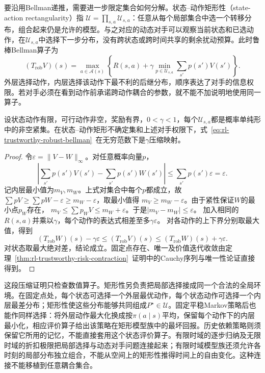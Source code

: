 要沿用Bellman递推，需要进一步限定集合如何分解。状态--动作矩形性（state-action rectangularity）指
$\mathcal U=\prod_{s,a}\mathcal U_{s,a}$：任意从每个局部集合中选一个转移分布，组合起来仍是允许的模型。与之对应的动态对手可以观察当前状态和已选动作，在$\mathcal U_{s,a}$中选择下一步分布，没有跨状态或跨时间共享的剩余扰动预算。此时鲁棒Bellman算子为
\begin{equation}
  (T_{\mathrm{rob}}V)(s)
    =\max_{a\in\mathcal A(s)}
      \left\{R(s,a)+\gamma
        \min_{p\in\mathcal U_{s,a}}\sum_{s'}p(s')V(s')\right\}.
  \label{eq:rl-trustworthy-robust-bellman}
\end{equation}
外层选择动作，内层选择该动作下最不利的后继分布，顺序表达了对手的信息权限。若对手必须在看到动作前承诺跨动作耦合的参数，就不能不加说明地使用同一算子。

\begin{theorem}[矩形鲁棒Bellman算子的压缩性]
  \label{thm:rl-trustworthy-robust-contraction}
  设状态动作有限，可行动作非空，奖励有界，$0<\gamma<1$，每个$\mathcal U_{s,a}$都是概率单纯形中的非空紧集。在状态--动作矩形不确定集和上述对手权限下，式~\eqref{eq:rl-trustworthy-robust-bellman}~在无穷范数下是$\gamma$压缩映射。
\end{theorem}
\begin{proof}
  令$\varepsilon=\lVert V-W\rVert_\infty$。对任意概率向量$p$，
  \[
    \left|\sum_{s'}p(s')V(s')-\sum_{s'}p(s')W(s')\right|
      \leq\sum_{s'}p(s')\varepsilon=\varepsilon.
  \]
  记内层最小值为$m_V,m_W$。上式对集合中每个$p$都成立，故
  $\sum pV\geq\sum pW-\varepsilon\geq m_W-\varepsilon$，取最小值得
  $m_V\geq m_W-\varepsilon$。由于紧性保证$W$的最小点$p_W$存在，
  $m_V\leq\sum p_WV\leq m_W+\varepsilon$。于是$|m_V-m_W|\leq\varepsilon$。
  加入相同的$R(s,a)$并乘以$\gamma$，每个动作的表达式相差至多$\gamma\varepsilon$。
  对各动作的上下界分别取最大值，得到
  \[
    (T_{\mathrm{rob}}W)(s)-\gamma\varepsilon
      \leq(T_{\mathrm{rob}}V)(s)
      \leq(T_{\mathrm{rob}}W)(s)+\gamma\varepsilon.
  \]
  对状态取最大绝对差，结论成立。固定点存在、唯一及价值迭代收敛由定理~\ref{thm:rl-trustworthy-risk-contraction}~证明中的Cauchy序列与唯一性论证直接得到。
\end{proof}

这段压缩证明只检查数值算子。矩形性另负责把局部选择接成同一个合法的全局环境。在固定点处，每个状态可选择一个外层最优动作，每个状态动作可选择一个内层最差分布；矩形性使这些分布能够共同组成$P^\star\in\mathcal U$。固定平稳Markov策略后也能作同样选择：将外层动作最大化换成按$\pi(a\mid s)$平均，保留每个动作下的内层最小化，相应评价算子给出该策略在矩形模型族中的最坏回报。历史依赖策略则须保留它所用的记忆，不能直接套用这个状态评价算子。有限时域的逐步归纳及无限时域的折扣极限把局部选择与动态对手问题连接起来；有限时域模型族还须允许各时刻的局部分布独立组合，不能从空间上的矩形性推得时间上的自由变化。这种连接不能移植到任意耦合集合。

